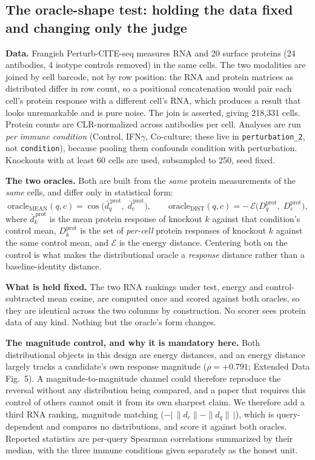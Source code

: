 \documentclass[11pt,letterpaper]{article}
\begin{document}
\subsection*{The oracle-shape test: holding the data fixed and changing only the judge}

\textbf{Data.} Frangieh Perturb-CITE-seq measures RNA and 20 surface proteins (24 antibodies, 4
isotype controls removed) in the same cells. The two modalities are joined by cell
barcode, not by row position: the RNA and protein matrices as distributed differ in row count, so
a positional concatenation would pair each cell's protein response with a different cell's RNA,
which produces a result that looks unremarkable and is pure noise. The join is asserted, giving
218,331 cells. Protein counts are CLR-normalized across antibodies per cell. Analyses are run
\emph{per immune condition} (Control, IFN$\gamma$, Co-culture; these live in
\texttt{perturbation\_2}, not \texttt{condition}), because pooling them confounds condition with
perturbation. Knockouts with at least 60 cells are used, subsampled to 250, seed fixed.

\textbf{The two oracles.} Both are built from the \emph{same} protein measurements of the
\emph{same} cells, and differ only in statistical form:
\[
\mathrm{oracle}_{\mathrm{MEAN}}(q,c) = \cos\big(\bar{d}^{\,\mathrm{prot}}_q,\;
\bar{d}^{\,\mathrm{prot}}_c\big), \qquad
\mathrm{oracle}_{\mathrm{DIST}}(q,c) = -\,\mathcal{E}\big(D^{\mathrm{prot}}_q,\;
D^{\mathrm{prot}}_c\big),
\]
where $\bar{d}^{\,\mathrm{prot}}_k$ is the mean protein response of knockout $k$ against that
condition's control mean, $D^{\mathrm{prot}}_k$ is the set of \emph{per-cell} protein responses of
knockout $k$ against the same control mean, and $\mathcal{E}$ is the energy distance. Centering both
on the control is what makes the distributional oracle a \emph{response} distance rather than a
baseline-identity distance.

\textbf{What is held fixed.} The two RNA rankings under test, energy and control-subtracted mean
cosine, are computed once and scored against both oracles, so they are identical across the two
columns by construction. No scorer sees protein data of any kind. Nothing but the oracle's form
changes.

\textbf{The magnitude control, and why it is mandatory here.} Both distributional objects in this
design are energy distances, and an energy distance largely tracks a candidate's own response
magnitude ($\rho = +0.791$; Extended Data Fig.~5). A magnitude-to-magnitude channel could therefore
reproduce the reversal without any distribution being compared, and a paper that requires this
control of others cannot omit it from its own sharpest claim. We therefore add a third RNA ranking,
magnitude matching ($-\big|\,\|d_c\| - \|d_q\|\,\big|$), which is query-dependent and compares no
distributions, and score it against both oracles. Reported statistics are per-query Spearman
correlations summarized by their median, with the three immune conditions given separately as the
honest unit.
\end{document}
